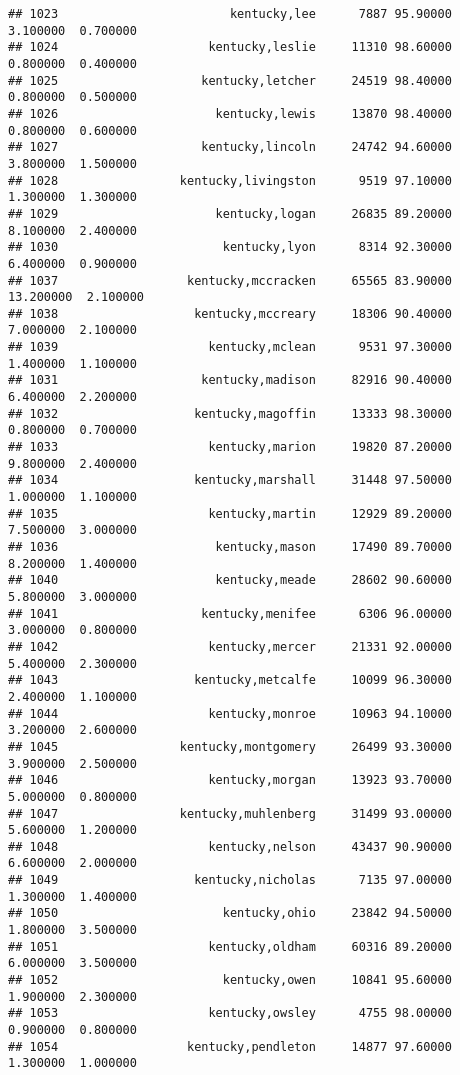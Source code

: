 \documentclass[
]{article}
\begin{document}
\begin{verbatim}
## 1023                        kentucky,lee      7887 95.90000  3.100000  0.700000
## 1024                     kentucky,leslie     11310 98.60000  0.800000  0.400000
## 1025                    kentucky,letcher     24519 98.40000  0.800000  0.500000
## 1026                      kentucky,lewis     13870 98.40000  0.800000  0.600000
## 1027                    kentucky,lincoln     24742 94.60000  3.800000  1.500000
## 1028                 kentucky,livingston      9519 97.10000  1.300000  1.300000
## 1029                      kentucky,logan     26835 89.20000  8.100000  2.400000
## 1030                       kentucky,lyon      8314 92.30000  6.400000  0.900000
## 1037                  kentucky,mccracken     65565 83.90000 13.200000  2.100000
## 1038                   kentucky,mccreary     18306 90.40000  7.000000  2.100000
## 1039                     kentucky,mclean      9531 97.30000  1.400000  1.100000
## 1031                    kentucky,madison     82916 90.40000  6.400000  2.200000
## 1032                   kentucky,magoffin     13333 98.30000  0.800000  0.700000
## 1033                     kentucky,marion     19820 87.20000  9.800000  2.400000
## 1034                   kentucky,marshall     31448 97.50000  1.000000  1.100000
## 1035                     kentucky,martin     12929 89.20000  7.500000  3.000000
## 1036                      kentucky,mason     17490 89.70000  8.200000  1.400000
## 1040                      kentucky,meade     28602 90.60000  5.800000  3.000000
## 1041                    kentucky,menifee      6306 96.00000  3.000000  0.800000
## 1042                     kentucky,mercer     21331 92.00000  5.400000  2.300000
## 1043                   kentucky,metcalfe     10099 96.30000  2.400000  1.100000
## 1044                     kentucky,monroe     10963 94.10000  3.200000  2.600000
## 1045                 kentucky,montgomery     26499 93.30000  3.900000  2.500000
## 1046                     kentucky,morgan     13923 93.70000  5.000000  0.800000
## 1047                 kentucky,muhlenberg     31499 93.00000  5.600000  1.200000
## 1048                     kentucky,nelson     43437 90.90000  6.600000  2.000000
## 1049                   kentucky,nicholas      7135 97.00000  1.300000  1.400000
## 1050                       kentucky,ohio     23842 94.50000  1.800000  3.500000
## 1051                     kentucky,oldham     60316 89.20000  6.000000  3.500000
## 1052                       kentucky,owen     10841 95.60000  1.900000  2.300000
## 1053                     kentucky,owsley      4755 98.00000  0.900000  0.800000
## 1054                  kentucky,pendleton     14877 97.60000  1.300000  1.000000

\end{verbatim}
\end{document}
